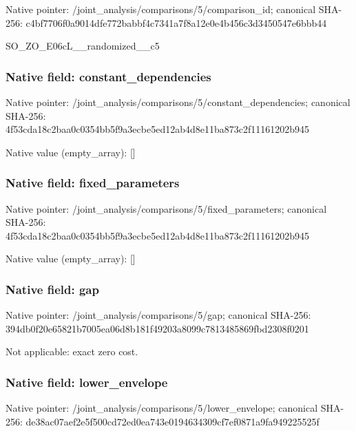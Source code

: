 \documentclass[10pt,a4paper]{article}
\begin{document}
Native pointer: /joint\_analysis/comparis\allowbreak{}ons/5/comparison\_id; canonical SHA-256: c4bf7706f0a9014dfe772bab\allowbreak{}bf4c7341a7f8a12e0e4b456c\allowbreak{}3d3450547e6bbb44


SO\_ZO\_E06cL\_\_randomized\_\_c5


\subsubsection{Native field: constant\_dependencies}


Native pointer: /joint\_analysis/comparis\allowbreak{}ons/5/constant\_dependenc\allowbreak{}ies; canonical SHA-256: 4f53cda18c2baa0c0354bb5f\allowbreak{}9a3ecbe5ed12ab4d8e11ba87\allowbreak{}3c2f11161202b945



Native value (empty\_array): []



\subsubsection{Native field: fixed\_parameters}


Native pointer: /joint\_analysis/comparis\allowbreak{}ons/5/fixed\_parameters; canonical SHA-256: 4f53cda18c2baa0c0354bb5f\allowbreak{}9a3ecbe5ed12ab4d8e11ba87\allowbreak{}3c2f11161202b945



Native value (empty\_array): []



\subsubsection{Native field: gap}


Native pointer: /joint\_analysis/comparisons/5/gap; canonical SHA-256: 394db0f20e65821b7005ea06\allowbreak{}d8b181f49203a8099c781348\allowbreak{}5869fbd2308f0201


Not applicable: exact zero cost.


\subsubsection{Native field: lower\_envelope}


Native pointer: /joint\_analysis/comparis\allowbreak{}ons/5/lower\_envelope; canonical SHA-256: de38ac07aef2e5f500cd72ed\allowbreak{}0ea743e0194634309cf7ef08\allowbreak{}71a9fa949225525f
\end{document}
